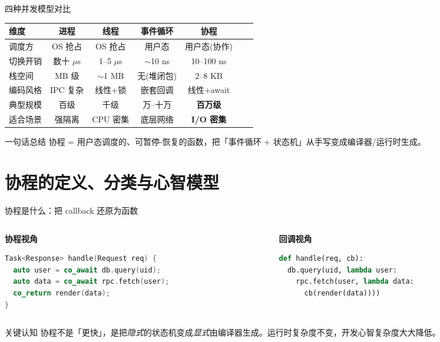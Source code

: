 \documentclass[aspectratio=169, 10pt]{beamer}
\begin{document}
\begin{frame}{四种并发模型对比}
  \centering
  \small
  \begin{tabular}{lcccccc}
    \toprule
    \textbf{维度} & \textbf{进程} & \textbf{线程} & \textbf{事件循环} & \textbf{协程} \\
    \midrule
    调度方     & OS 抢占 & OS 抢占 & 用户态 & 用户态(协作) \\
    切换开销   & 数十 $\mu$s & 1--5 $\mu$s & $\sim$10 ns & 10--100 ns \\
    栈空间     & MB 级 & $\sim$1 MB & 无(堆闭包) & 2--8 KB \\
    编码风格   & IPC 复杂 & 线性+锁 & 嵌套回调 & 线性+await \\
    典型规模   & 百级 & 千级 & 万--十万 & \textbf{百万级} \\
    适合场景   & 强隔离 & CPU 密集 & 底层网络 & \textbf{I/O 密集} \\
    \bottomrule
  \end{tabular}

  \vspace{0.5cm}
  \begin{block}{一句话总结}
    协程 = 用户态调度的、可暂停-恢复的函数，把「事件循环 + 状态机」从手写变成编译器/运行时生成。
  \end{block}
\end{frame}

\section{协程的定义、分类与心智模型}

\begin{frame}[fragile]{协程是什么：把 callback 还原为函数}
  \begin{columns}[T]
    \begin{column}{0.48\textwidth}
      \textbf{协程视角}
      \begin{lstlisting}[language=C++, title={线性、可读}]
Task<Response> handle(Request req) {
  auto user = co_await db.query(uid);
  auto data = co_await rpc.fetch(user);
  co_return render(data);
}
      \end{lstlisting}
    \end{column}
    \begin{column}{0.48\textwidth}
      \textbf{回调视角}
      \begin{lstlisting}[language=Python, title={嵌套、难维护}]
def handle(req, cb):
  db.query(uid, lambda user:
    rpc.fetch(user, lambda data:
      cb(render(data))))
      \end{lstlisting}
    \end{column}
  \end{columns}

  \vspace{0.3cm}
  \begin{alertblock}{关键认知}
    协程不是「更快」，是把\textit{隐式}的状态机变成\textit{显式}由编译器生成。运行时复杂度不变，开发心智复杂度大大降低。
  \end{alertblock}
\end{frame}
\end{document}
